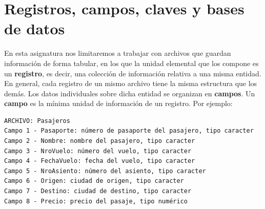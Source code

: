 \documentclass[
]{book}
\begin{document}
\hypertarget{registros-campos-claves-y-bases-de-datos}{%
\section{Registros, campos, claves y bases de datos}\label{registros-campos-claves-y-bases-de-datos}}

En esta asignatura nos limitaremos a trabajar con archivos que guardan información de forma tabular, en los que la unidad elemental que los compone es un \textbf{registro}, es decir, una colección de información relativa a una misma entidad. En general, cada registro de un mismo archivo tiene la misma estructura que los demás. Los datos individuales sobre dicha entidad se organizan en \textbf{campos}. Un \textbf{campo} es la mínima unidad de información de un registro. Por ejemplo:

\begin{verbatim}
ARCHIVO: Pasajeros
Campo 1 - Pasaporte: número de pasaporte del pasajero, tipo caracter
Campo 2 - Nombre: nombre del pasajero, tipo caracter
Campo 3 - NroVuelo: número del vuelo, tipo caracter
Campo 4 - FechaVuelo: fecha del vuelo, tipo caracter
Campo 5 - NroAsiento: número del asiento, tipo caracter
Campo 6 - Origen: ciudad de origen, tipo caracter
Campo 7 - Destino: ciudad de destino, tipo caracter
Campo 8 - Precio: precio del pasaje, tipo numérico
\end{verbatim}
\end{document}

